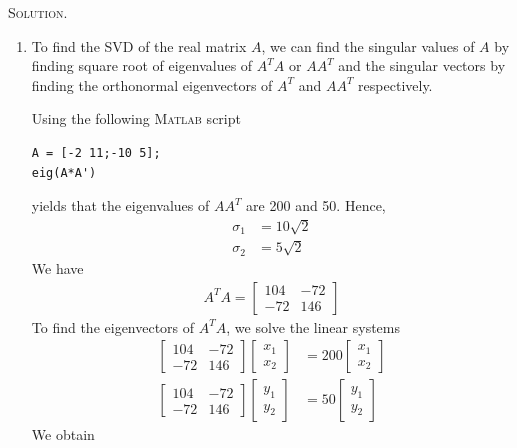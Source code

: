 \documentclass[a4paper,oneside]{book}
\numberwithin{equation}{chapter}
\begin{document}
\textsc{Solution.} 
\begin{enumerate}
\item To find the SVD of the real matrix $A$, we can find the singular values of $A$ by finding square root of eigenvalues of $A^TA$ or $AA^T$ and the singular vectors by finding the orthonormal eigenvectors of $A^T$ and $AA^T$ respectively.

Using the following \textsc{Matlab} script
\begin{verbatim}
A = [-2 11;-10 5];
eig(A*A')
\end{verbatim}
yields that the eigenvalues of $AA^T$ are 200 and 50. Hence, 
\begin{align}
{\sigma _1} &= 10\sqrt 2 \\
{\sigma _2} &= 5\sqrt 2 
\end{align}
We have
\begin{align}
{A^T}A = \left[ {\begin{array}{*{20}{c}}
{104}&{ - 72}\\
{ - 72}&{146}
\end{array}} \right]
\end{align}
To find the eigenvectors of $A^TA$, we solve the linear systems
\begin{align}
\left[ {\begin{array}{*{20}{c}}
{104}&{ - 72}\\
{ - 72}&{146}
\end{array}} \right]\left[ {\begin{array}{*{20}{c}}
{{x_1}}\\
{{x_2}}
\end{array}} \right] &= 200\left[ {\begin{array}{*{20}{c}}
{{x_1}}\\
{{x_2}}
\end{array}} \right]\\
\left[ {\begin{array}{*{20}{c}}
{104}&{ - 72}\\
{ - 72}&{146}
\end{array}} \right]\left[ {\begin{array}{*{20}{c}}
{{y_1}}\\
{{y_2}}
\end{array}} \right] &= 50\left[ {\begin{array}{*{20}{c}}
{{y_1}}\\
{{y_2}}
\end{array}} \right]
\end{align}
We obtain
\begin{align}

\end{align}
\end{enumerate}
\end{document}
